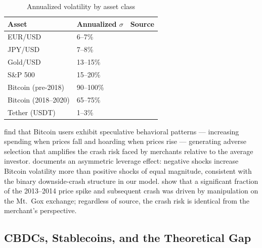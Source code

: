 \documentclass{article}
\begin{document}
\begin{table}[h]
\centering
\caption{Annualized volatility by asset class}
\label{tab:volatility}
\begin{tabular}{lll}
\toprule
Asset & Annualized $\sigma$ & Source \\
\midrule
EUR/USD         & 6--7\%    & \citet{baur2021} \\
JPY/USD         & 7--8\%    & \citet{katsiampa2017} \\
Gold/USD        & 13--15\%  & \citet{dyhrberg2016} \\
S\&P 500        & 15--20\%  & \citet{bohme2015} \\
Bitcoin (pre-2018) & 90--100\% & \citet{katsiampa2017} \\
Bitcoin (2018--2020) & 65--75\% & \citet{baur2021} \\
Tether (USDT)   & 1--3\%    & \citet{lyons2023} \\
\bottomrule
\end{tabular}
\end{table}

\citet{baur2018} find that Bitcoin users exhibit speculative behavioral
patterns --- increasing spending when prices fall and hoarding when prices
rise --- generating adverse selection that amplifies the crash risk faced by
merchants relative to the average investor.
\citet{dyhrberg2016} documents an asymmetric leverage effect: negative shocks
increase Bitcoin volatility more than positive shocks of equal magnitude,
consistent with the binary downside-crash structure in our model.
\citet{gandal2018} show that a significant fraction of the 2013--2014 price
spike and subsequent crash was driven by manipulation on the Mt.\ Gox
exchange; regardless of source, the crash risk is identical from the merchant's
perspective.

\subsection{CBDCs, Stablecoins, and the Theoretical Gap}
\end{document}
